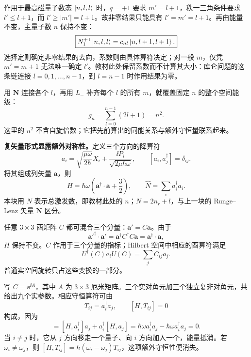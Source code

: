 作用于最高磁量子数态 $\left|n,l,l\right\rangle$ 时，$q=+1$ 要求 $m'=l+1$，秩一三角条件要求 $l'\le l+1$，而 $l'\ge|m'|=l+1$。故非零结果只能具有 $l'=m'=l+1$。再由能量不变，主量子数 $n$ 保持不变：
\begin{equation}
  \boxed{N_1^{+1}\left|n,l,l\right\rangle=c_{nl}\left|n,l+1,l+1\right\rangle.}
\end{equation}
选择定则确定非零结果的去向，系数则由具体算符决定；对一般 $m$，仅凭 $m'=m+1$ 无法唯一确定 $l'$。教材此处保留系数而不计算其大小：库仑问题的这条链连接 $l=0,1,\ldots,n-1$，到 $l=n-1$ 时作用结果为零。

用 $\mathbf N$ 连接各个 $l$，再用 $L_-$ 补齐每个 $l$ 的所有 $m$，就覆盖固定 $n$ 的整个空间能级：
\begin{equation}
  \boxed{g_n=\sum_{l=0}^{n-1}(2l+1)=n^2.}
\end{equation}
这里的 $n^2$ 不含自旋倍数；它把先前算出的同能关系与额外守恒量联系起来。

\textbf{复矢量形式显露额外对称性。}定义三个方向的降算符
\begin{equation}
  a_i=\sqrt{\frac{\mu\omega}{2\hbar}}X_i
     +\frac{\ii P_i}{\sqrt{2\mu\hbar\omega}},\qquad
  [a_i,a_j^\dagger]=\delta_{ij}.
\end{equation}
将其组成列矢量 $\mathbf a$，则
\begin{equation}
  \boxed{H=\hbar\omega\left(\mathbf a^\dagger\cdot\mathbf a+\frac32\right),
    \qquad \widehat N=\sum_i a_i^\dagger a_i.}
\end{equation}
本块用 $N$ 表示总激发数，即教材此处的 $n$；$N=2n_r+l$，与上一块的 Runge--Lenz 矢量 $\mathbf N$ 区分。

任意 $3\times3$ 酉矩阵 $C$ 都可混合三个分量：$\mathbf a'=C\mathbf a$。由于
\begin{equation}
  \mathbf a'^\dagger\cdot\mathbf a'
     =\mathbf a^\dagger C^\dagger C\mathbf a
     =\mathbf a^\dagger\cdot\mathbf a,
\end{equation}
$H$ 保持不变。$C$ 作用于三个分量的指标；Hilbert 空间中相应的酉算符满足
\begin{equation}
  U^\dagger(C)a_iU(C)=\sum_jC_{ij}a_j.
\end{equation}
普通实空间旋转只占这些变换的一部分。

写 $C=\ee^{\ii A}$，其中 $A$ 为 $3\times3$ 厄米矩阵。三个实对角元加三个独立复非对角元，共给出九个实参数。相应守恒算符可由
\begin{equation}
  \boxed{T_{ij}=a_i^\dagger a_j,\qquad [H,T_{ij}]=0}
\end{equation}
构成，因为
\begin{equation}
  [H,a_i^\dagger a_j]
   =[H,a_i^\dagger]a_j+a_i^\dagger[H,a_j]
   =\hbar\omega a_i^\dagger a_j-\hbar\omega a_i^\dagger a_j=0.
\end{equation}
当 $i\ne j$ 时，它从 $j$ 方向移走一个量子、向 $i$ 方向加入一个，能量抵消。若 $\omega_i\ne\omega_j$，则 $[H,T_{ij}]=\hbar(\omega_i-\omega_j)T_{ij}$，这项额外守恒性便消失。

